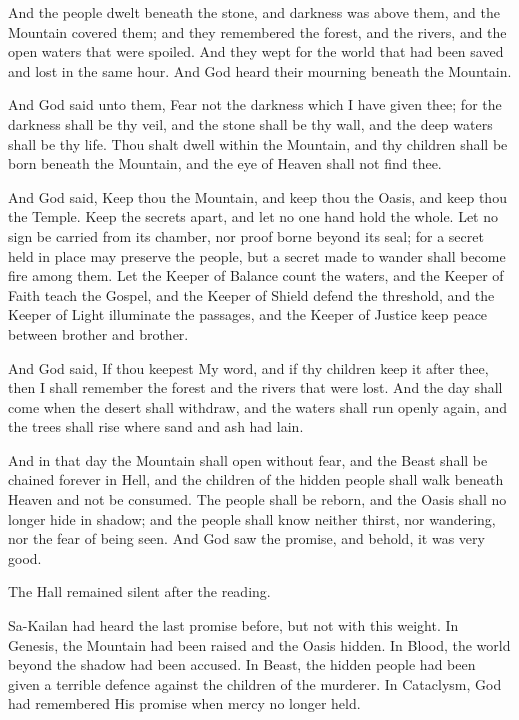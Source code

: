 \begin{scripture}
And the people dwelt beneath the stone, and darkness was above them, and the Mountain covered them; and they remembered the forest, and the rivers, and the open waters that were spoiled.
And they wept for the world that had been saved and lost in the same hour.
And God heard their mourning beneath the Mountain.

And God said unto them, Fear not the darkness which I have given thee; for the darkness shall be thy veil, and the stone shall be thy wall, and the deep waters shall be thy life.
Thou shalt dwell within the Mountain, and thy children shall be born beneath the Mountain, and the eye of Heaven shall not find thee.

And God said, Keep thou the Mountain, and keep thou the Oasis, and keep thou the Temple.
Keep the secrets apart, and let no one hand hold the whole.
Let no sign be carried from its chamber, nor proof borne beyond its seal; for a secret held in place may preserve the people, but a secret made to wander shall become fire among them.
Let the Keeper of Balance count the waters, and the Keeper of Faith teach the Gospel, and the Keeper of Shield defend the threshold, and the Keeper of Light illuminate the passages, and the Keeper of Justice keep peace between brother and brother.

And God said, If thou keepest My word, and if thy children keep it after thee, then I shall remember the forest and the rivers that were lost.
And the day shall come when the desert shall withdraw, and the waters shall run openly again, and the trees shall rise where sand and ash had lain.

And in that day the Mountain shall open without fear, and the Beast shall be chained forever in Hell, and the children of the hidden people shall walk beneath Heaven and not be consumed.
The people shall be reborn, and the Oasis shall no longer hide in shadow; and the people shall know neither thirst, nor wandering, nor the fear of being seen.
And God saw the promise, and behold, it was very good.
\end{scripture}
The Hall remained silent after the reading.\par
Sa-Kailan had heard the last promise before, but not with this weight.
In Genesis, the Mountain had been raised and the Oasis hidden.
In Blood, the world beyond the shadow had been accused.
In Beast, the hidden people had been given a terrible defence against the children of the murderer.
In Cataclysm, God had remembered His promise when mercy no longer held.
